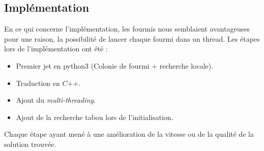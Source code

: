 \documentclass[b]{beamer}
\begin{document}
\subsection{Implémentation}
\begin{frame}
En ce qui concerne l'implémentation, les fourmis nous semblaient avantageuses pour une raison, la possibilité de lancer chaque fourmi dans un thread. Les étapes lors de l'implémentation ont été :
\begin{itemize}
	\item Premier jet en python3 (Colonie de fourmi + recherche locale).
	\item Traduction en $C$++.
	\item Ajout du \emph{multi-threading}.
	\item Ajout de la recherche tabou lors de l'initialisation.
\end{itemize}
Chaque étape ayant mené à une amélioration de la vitesse ou de la qualité de la solution trouvée.
\end{frame}
\end{document}
